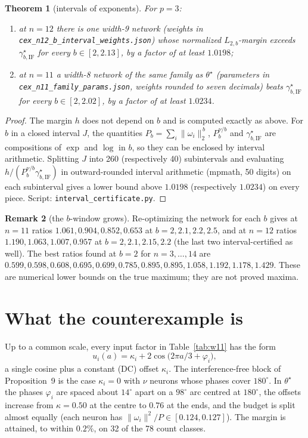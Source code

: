 \documentclass[11pt]{article}
\newtheorem{theorem}{Theorem}
\theoremstyle{definition}
\newtheorem{remark}[theorem]{Remark}
\newcommand{\gIF}{\gamma^{\star}_{b,\mathrm{IF}}}
\begin{document}
\begin{theorem}[intervals of exponents]\label{thm:b}
For $p=3$:
\begin{enumerate}
\item at $n=12$ there is one width-9 network (weights in \texttt{cex\_n12\_b\_interval\_weights.json}) whose
normalized $L_{2,b}$-margin exceeds $\gIF$ for \emph{every} $b\in[2,2.13]$, by a factor of at least $1.0198$;
\item at $n=11$ a width-8 network of the same family as $\theta^\star$ (parameters in
\texttt{cex\_n11\_family\_params.json}, weights rounded to seven decimals) beats $\gIF$ for every $b\in[2,2.02]$,
by a factor of at least $1.0234$.
\end{enumerate}
\end{theorem}
\begin{proof}
The margin $h$ does not depend on $b$ and is computed exactly as above. For $b$ in a closed interval $J$, the
quantities $P_b=\sum_i\|\omega_i\|_2^{\,b}$, $P_b^{\nu/b}$ and $\gIF$ are compositions of $\exp$ and $\log$
in $b$, so they can be enclosed by interval arithmetic. Splitting $J$ into 260 (respectively 40) subintervals and evaluating
$h/(P_b^{\nu/b}\gIF)$ in outward-rounded interval arithmetic (mpmath, 50 digits) on each subinterval gives a
lower bound above $1.0198$ (respectively $1.0234$) on every piece. Script: \texttt{interval\_certificate.py}.
\end{proof}

\begin{remark}[the $b$-window grows]
Re-optimizing the network for each $b$ gives at $n=11$ ratios $1.061, 0.904, 0.852, 0.653$ at
$b=2, 2.1, 2.2, 2.5$, and at $n=12$ ratios $1.190, 1.063, 1.007, 0.957$ at $b=2, 2.1, 2.15, 2.2$
(the last two interval-certified as well). The best ratios found at $b=2$ for $n=3,\dots,14$ are
$0.599, 0.598, 0.608, 0.695, 0.699, 0.785, 0.895, 0.895, 1.058, 1.192, 1.178, 1.429$. These are numerical lower bounds
on the true maximum; they are not proved maxima.
\end{remark}

\section{What the counterexample is}

Up to a common scale, every input factor in Table~\ref{tab:w11} has the form
\[
u_i(a)=\kappa_i+2\cos\!\big(2\pi a/3+\varphi_i\big),
\]
a single cosine plus a constant (DC) offset $\kappa_i$. The interference-free block of Proposition~9 is the case
$\kappa_i=0$ with $\nu$ neurons whose phases cover $180^\circ$. In $\theta^\star$ the phases $\varphi_i$ are spaced
about $14^\circ$ apart on a $98^\circ$ arc centred at $180^\circ$, the offsets increase from $\kappa=0.50$ at the
centre to $0.76$ at the ends, and the budget is split almost equally (each neuron has $\|\omega_i\|^2/P\in[0.124,0.127]$).
The margin is attained, to within $0.2\%$, on 32 of the 78 count classes.
\end{document}
